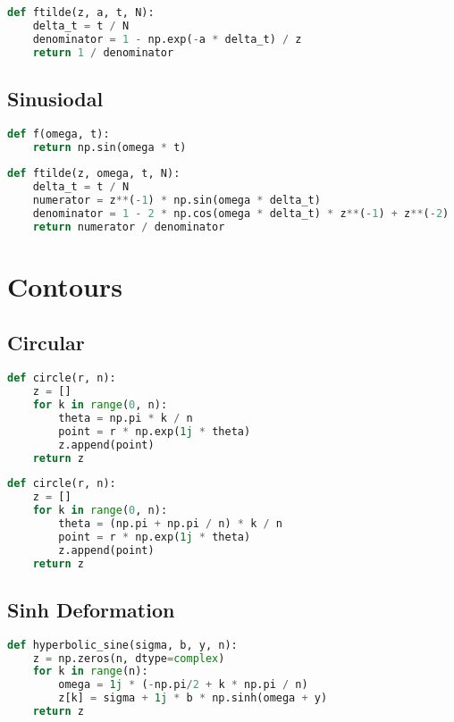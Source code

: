 \begin{appendices}
\begin{lstlisting}[language=Python, caption= Implementation of the Decaying Exp function and its $\mathcal{Z}$-transform (Section \ref{section:decaying_exp})]
def ftilde(z, a, t, N):
    delta_t = t / N
    denominator = 1 - np.exp(-a * delta_t) / z
    return 1 / denominator
\end{lstlisting}

\newpage
\subsection{Sinusiodal}
\begin{lstlisting}[language=Python, caption= Implementation of the Sinusoidal function and its $\mathcal{Z}$-transform (Section \ref{section:sinusoidal})]
def f(omega, t):
    return np.sin(omega * t)
    
def ftilde(z, omega, t, N):
    delta_t = t / N
    numerator = z**(-1) * np.sin(omega * delta_t)
    denominator = 1 - 2 * np.cos(omega * delta_t) * z**(-1) + z**(-2)
    return numerator / denominator
\end{lstlisting}

\section{Contours}

\subsection{Circular}
\begin{lstlisting}[language=Python, caption= Implementation of a circular contour from $0 \leq \theta < \pi$.]
def circle(r, n):
    z = []
    for k in range(0, n):
        theta = np.pi * k / n
        point = r * np.exp(1j * theta)
        z.append(point)
    return z
\end{lstlisting}

\begin{lstlisting}[language=Python, caption= Implementation of a circular contour from $0 \leq \theta \leq \pi$.]
def circle(r, n):
    z = []
    for k in range(0, n):
        theta = (np.pi + np.pi / n) * k / n
        point = r * np.exp(1j * theta)
        z.append(point)
    return z
\end{lstlisting}

\subsection{Sinh Deformation}
\begin{lstlisting}[language=Python, caption= Implementation of the conformal mapping (Equation \ref{equation:conformal_mapping}) from $-\frac{\pi}{2} \leq \omega < \frac{\pi}{2}$.]
def hyperbolic_sine(sigma, b, y, n):
    z = np.zeros(n, dtype=complex)
    for k in range(n):
        omega = 1j * (-np.pi/2 + k * np.pi / n)
        z[k] = sigma + 1j * b * np.sinh(omega + y)
    return z
\end{lstlisting}


\end{appendices}
